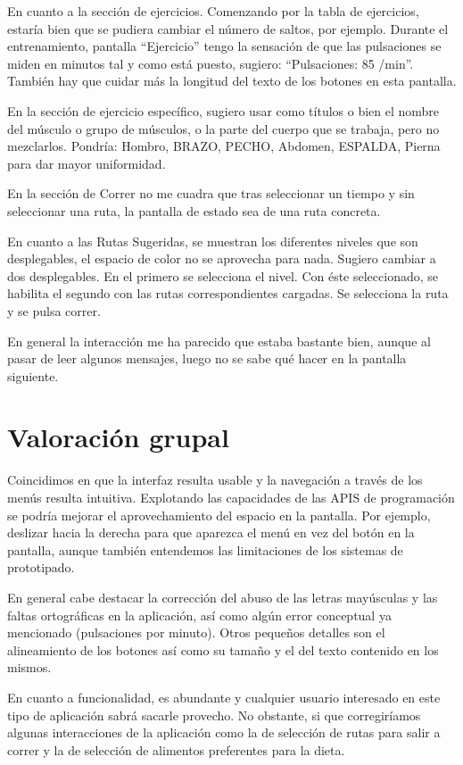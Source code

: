 \documentclass[a4paper]{article}
\begin{document}
En cuanto a la sección de ejercicios. Comenzando por la tabla de ejercicios, estaría bien que se pudiera cambiar el número de saltos, por ejemplo. Durante el entrenamiento, pantalla ``Ejercicio'' tengo la sensación de que las pulsaciones se miden en minutos tal y como está puesto, sugiero: ``Pulsaciones: 85 /min''. También hay que cuidar más la longitud del texto de los botones en esta pantalla.

En la sección de ejercicio específico, sugiero usar como títulos o bien el nombre del músculo o grupo de músculos, o la parte del cuerpo que se trabaja, pero no mezclarlos. Pondría: Hombro, BRAZO, PECHO, Abdomen, ESPALDA, Pierna para dar mayor uniformidad.

En la sección de Correr no me cuadra que tras seleccionar un tiempo y sin seleccionar una ruta, la pantalla de estado sea de una ruta concreta.

En cuanto a las Rutas Sugeridas, se muestran los diferentes niveles que son desplegables, el espacio de color no se aprovecha para nada. Sugiero cambiar a dos desplegables. En el primero se selecciona el nivel. Con éste seleccionado, se habilita el segundo con las rutas correspondientes cargadas. Se selecciona la ruta y se pulsa correr.

En general la interacción me ha parecido que estaba bastante bien, aunque al pasar de leer algunos mensajes, luego no se sabe qué hacer en la pantalla siguiente.

\section{Valoración grupal}

Coincidimos en que la interfaz resulta usable y la navegación a través de los menús resulta intuitiva. Explotando las capacidades de las APIS de programación se podría mejorar el aprovechamiento del espacio en la pantalla. Por ejemplo, deslizar hacia la derecha para que aparezca el menú en vez del botón en la pantalla, aunque también entendemos las limitaciones de los sistemas de prototipado.

En general cabe destacar la corrección del abuso de las letras mayúsculas y las faltas ortográficas en la aplicación, así como algún error conceptual ya mencionado (pulsaciones por minuto). Otros pequeños detalles son el alineamiento de los  botones así como su tamaño y el del texto contenido en los mismos.

En cuanto a funcionalidad, es abundante y cualquier usuario interesado en este tipo de aplicación sabrá sacarle provecho. No obstante, si que corregiríamos algunas interacciones de la aplicación como la de selección de rutas para salir a correr y la de selección de alimentos preferentes para la dieta.
 
\end{document}
